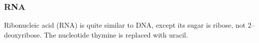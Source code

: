 \documentclass[../waterman_intro_comp_bio.tex]{subfiles}
\begin{document}
            \subsubsection{RNA}
                \begin{outline}
                    \1 Ribonucleic acid (RNA) is quite similar to DNA, except its sugar is ribose, not 2--deoxyribose.
                    \1 The nucleotide thymine is replaced with uracil.
                \end{outline}
\end{document}
